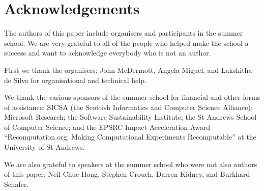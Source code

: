 \section*{Acknowledgements}
\label{s:ack}

The authors of this paper include organisers and participants in the
summer school. We are very grateful to all of the people who helped
make the school a success and want to acknowledge everybody who is not an
author.

First we thank the organisers: John McDermott, Angela Miguel, and Lakshitha de Silva for organisational and technical help.

We thank the various sponsors of the summer school for financial and
other forms of assistance:
SICSA (the Scottish Informatics and Computer Science Alliance); 
Microsoft Research; the Software Sustainability Institute; 
the St Andrews School of Computer Science;
and the EPSRC Impact Acceleration Award ``Recomputation.org: Making
Computational Experiments Recomputable''
at the University of St Andrews.

We are also grateful to speakers at the summer school who were not also authors of this paper: 
Neil Chue Hong,
Stephen Crouch, 
Darren Kidney, and
Burkhard Schafer.
